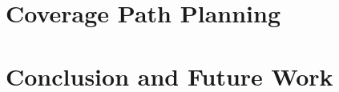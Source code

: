 \documentclass[a4paper,12pt, openright, twoside]{report}
\begin{document}
\chapter{Coverage Path Planning} %
\label{cha:coverage_path_planning}



\chapter{Conclusion and Future Work} %
\label{cha:conclusion}







\begin{appendices}





\end{appendices}

\pagebreak
\listoffigures
\listoftables
\listofalgorithms
\lstlistoflistings

\printindex

\end{document}
